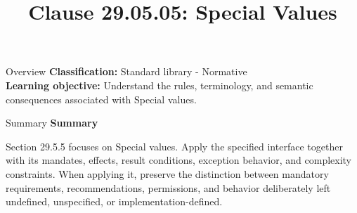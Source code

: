 \documentclass[10pt,letterpaper]{article}
\title{Clause 29.05.05: Special Values}
\author{}
\date{}
\begin{document}
\maketitle
\begin{CornellOverviewBox}{Overview}
\textbf{Classification:} Standard library - Normative\\[2pt]
\textbf{Learning objective:} Understand the rules, terminology, and semantic consequences associated with Special values.
\end{CornellOverviewBox}\begin{CornellSummaryBox}{Summary}
{\sffamily\bfseries\color{Accent} Summary}\par\vspace{3pt}Section 29.5.5 focuses on Special values. Apply the specified interface together with its mandates, effects, result conditions, exception behavior, and complexity constraints. When applying it, preserve the distinction between mandatory requirements, recommendations, permissions, and behavior deliberately left undefined, unspecified, or implementation-defined.
\end{CornellSummaryBox}
\end{document}
